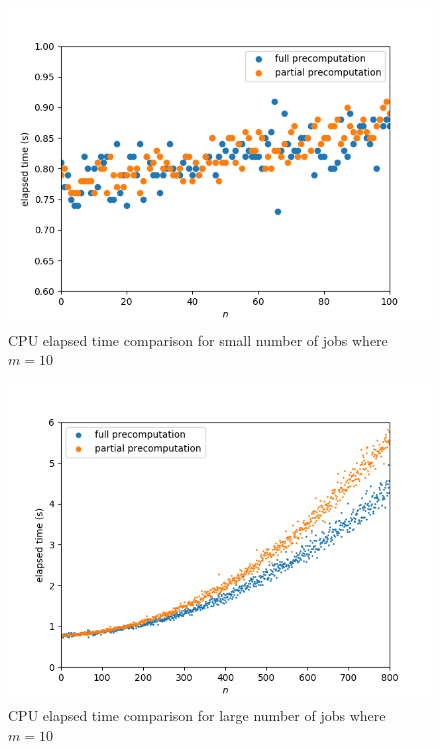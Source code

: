 \begin{figure}[H]
	\centering
	\includegraphics[scale=0.6]{figures/precomputation_cpu_small}
	\caption{CPU elapsed time comparison for small number of jobs where $m=10$}
\end{figure}

\begin{figure}[H]
	\centering
	\includegraphics[scale=0.6]{figures/precomputation_cpu_big}
	\caption{CPU elapsed time comparison for large number of jobs where $m=10$}
\end{figure}

